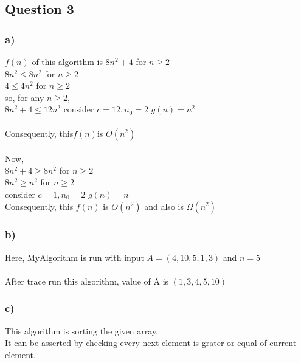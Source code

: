\documentclass[10pt, a4paper]{article}
\begin{document}
	\newpage
	
	
	
	\subsection*{Question 3}
	
	\subsubsection*{a)}
	{$f(n)$ of this algorithm is $8n^2+4$ for $n \geq 2$ \\}
	{$ 8n^2 \leq 8n^2$ for $ n \geq 2 $ \\}
	{$ 4 \leq 4n^2$ for $ n \geq 2 $ \\}
	{so, for any $n \geq 2$,\\}
	{$8n^2+4 \leq 12n^2 $ \rightarrow consider \hspace{.1cm} $c=12, n_0=2$ \rightarrow $ g(n) = n^2$ \\ \\}
	{Consequently, this\hspace{.1cm}$f(n)$\hspace{.1cm}is\hspace{.1cm} $O(n^2)$}
	\\\\
	{Now,\\}
	{$8n^2+4 \geq 8n^2 $ for $ n \geq 2$}\\
	{$8n^2 \geq n^2 $ for $ n \geq 2$}\\
	{\rightarrow consider $ c = 1, n_0 = 2 $ \rightarrow $ g(n) = n$}\\
	{Consequently, this $ f(n) $ is $ O(n^2) $ and \hspace{.1cm} also \hspace{.1cm} is $ \Omega(n^2)$}
	
	\subsubsection*{b)}
	{Here, MyAlgorithm is run with input $ A = (4,10,5,1,3) $ and $ n = 5$ \\ \\}
	{After trace run this algorithm, value of A is $ (1,3,4,5,10) $ }
	\subsubsection*{c)}
	{This algorithm is sorting the given array.}\\
	{It can be asserted by checking every next element is grater or equal of current element.}
	
\end{document}
